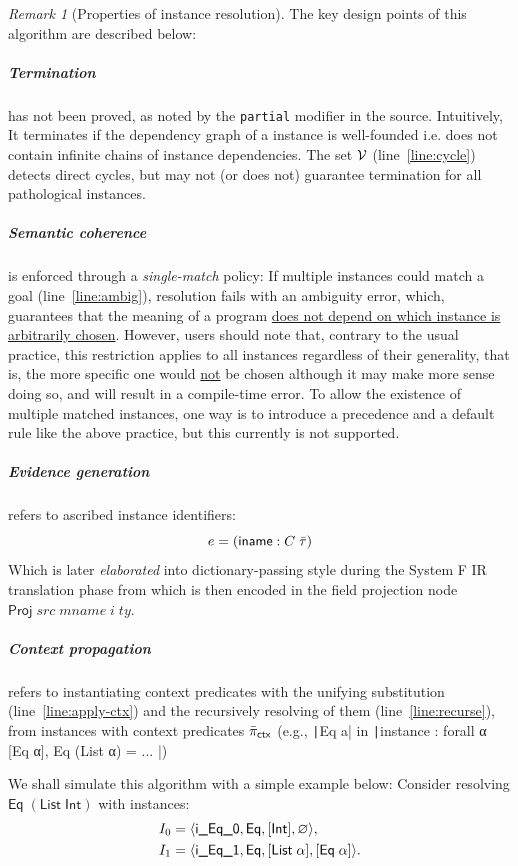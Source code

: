 \documentclass[a4paper, 11pt]{article}
\theoremstyle{remark}\newtheorem*{remark}{Remark}
\theoremstyle{definition}\newtheorem*{definition}{Definition}
\begin{document}
\begin{remark}[Properties of instance resolution]
The key design points of this algorithm are described below:
\subparagraph{Termination} has not been proved, as noted by the \texttt{partial} modifier in the source.
Intuitively, It terminates if the dependency graph of a instance is well-founded i.e. does not contain infinite
chains of instance dependencies. The set $\mathcal{V}$ (line~\autoref{line:cycle}) detects direct cycles,
but may not (or does not) guarantee termination for all pathological instances.
\subparagraph{Semantic coherence} is enforced through a \emph{single-match} policy: If multiple
instances could match a goal (line~\autoref{line:ambig}), resolution fails with an ambiguity error, which,
guarantees that the meaning of a program \underline{does not depend on which instance is arbitrarily chosen}.
However, users should note that, contrary to the usual practice, this restriction applies to
all instances regardless of their generality,
that is, the more specific one would \underline{not} be chosen although it may make more sense doing so,
and will result in a compile-time error. To allow the existence of multiple matched instances,
one way is to introduce a precedence and a default rule like the above practice,
but this currently is not supported.

\subparagraph{Evidence generation} refers to ascribed instance identifiers:
\[
  e = (\mathsf{iname} : C\;\bar{\tau})
\]
Which is later \emph{elaborated} into dictionary-passing style during the System F IR
translation phase from which is then encoded in the field projection node
$\mathsf{Proj}\;src\;mname\;i\;ty$.
\subparagraph{Context propagation} refers to instantiating context predicates
with the unifying substitution (line~\autoref{line:apply-ctx}) and the
recursively resolving of them (line~\autoref{line:recurse}), from
instances with context predicates $\bar{\pi}_{\mathsf{ctx}}$
(e.g., \texttt|Eq a| in \texttt|instance : forall α [Eq α], Eq (List α) = ... |)
\end{remark}
We shall simulate this algorithm with a simple example below:
Consider resolving $\mathsf{Eq}\;(\mathsf{List}\;\mathsf{Int})$ with instances:
\begin{align*}
I_0 &= \langle \textsf{i\_Eq\_0}, \mathsf{Eq}, [\mathsf{Int}], \varnothing \rangle, \\
I_1 &= \langle \textsf{i\_Eq\_1}, \mathsf{Eq}, [\mathsf{List}\;\alpha], [\mathsf{Eq}\;\alpha] \rangle.
\end{align*}
\end{document}
